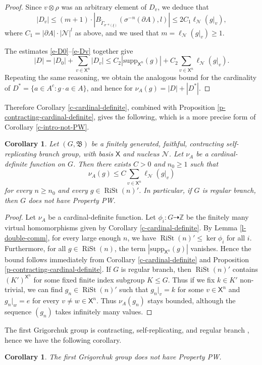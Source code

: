 \documentclass[11pt]{amsart}
\newcommand{\Z}{\ensuremath{\mathbb{Z}}}%
\newcommand{\bim}{\mathfrak{B}}
\newcommand{\rist}{\ensuremath{\operatorname{RiSt}}}%
\newcommand{\alb}{\ensuremath{\mathsf{X}}}%
\newcommand{\nuke}{\ensuremath{\mathcal{N}}}%
\newcommand{\Gammatilde}{\ensuremath{\widetilde{\Gamma}}}%
\theoremstyle{definition}
\theoremstyle{plain}
\newtheorem{main thm}{Theorem}
\newtheorem{cor}[defin]{Corollary}{}
\theoremstyle{remark}
\theoremstyle{plain}
\begin{document}
\begin{proof}
Since $v\otimes \rho$ was an arbitrary element of $D_v$, we deduce that 
\begin{equation} |D_v|\leq (m+1)\cdot |B_{\Gammatilde_{\sigma^{-n}(\xi)}}(\sigma^{-n}(\partial A), l)|\leq 2C_1 \ell_\nuke(g|_v), \label{e-Dv}\end{equation}
where $C_1=|\partial A|\cdot |\nuke |^l$ as above, and we used that $m=\ell_\nuke(g|_v)\ge 1$. 

The estimates \eqref{e-D0}--\eqref{e-Dv} together give 
\[|D|=|D_0|+\sum_{v\in \alb^n} |D_v| \leq C_2|\mathrm{supp}_{\alb^n}(g)|+ C_2\sum_{v\in \alb^n} \ell_\nuke(g|_v).\]
Repeating the same reasoning, we obtain the analogous bound for the cardinality of $D^\ast=\{a\in A^c\colon g\cdot a\in A\}$, and hence for $\nu_A(g)=|D|+|D^\ast|$. \qedhere
\end{proof}
Therefore Corollary \ref{c-cardinal-definite}, combined with Proposition \ref{p-contracting-cardinal-definite}, gives the following, which is a more precise form of Corollary \ref{c-intro-not-PW}. 
\begin{cor} \label{c-cardinal-definite-contracting}
Let $(G, \bim)$ be a finitely generated, faithful, contracting self-replicating branch group, with basis $\alb$ and nucleus $\nuke$. 
Let $\nu_A$ be a cardinal-definite function on $G$. Then there exists $C>0$ and $n_0\ge 1$ such that
\[\nu_A(g)\leq C\sum_{v\in \alb^n}\ell_\nuke(g|_v) \]
for every $n\ge n_0$ and every $g\in \rist(n)'$. In particular, if $G$ is regular branch, then $G$ does not have Property PW.

\end{cor}

\begin{proof}
    Let $\nu_A$ be a cardinal-definite function. Let $\phi_i\colon G\dashrightarrow \Z$ be the finitely many virtual homomorphisms given by Corollary \ref{c-cardinal-definite}. By Lemma \ref{l-double-comm}, for every large enough $n$, we have $\rist(n)'\le \ker \phi_i$ for all $i$. Furthermore, for all $g\in \rist(n)$,  the term $|\mathrm{supp}_{\alb^n}(g)|$ vanishes. Hence the bound follows immediately from Corollary \ref{c-cardinal-definite} and Proposition \ref{p-contracting-cardinal-definite}.  If $G$ is regular branch, then $\rist(n)'$ contains $(K')^{\alb^n}$ for some fixed finite index subgroup $K\le G$. Thus if we fix $k\in K'$ non-trivial, we can find $g_n\in \rist(n)'$ such that $g_n|_v=k$ for some $v\in \alb^n$ and $g_n|_w=e$ for every $v\neq w\in \alb^n$. Thus $\nu_A(g_n)$ stays bounded, although the sequence $(g_n)$ takes infinitely many values. \qedhere
\end{proof}
The first Grigorchuk group is contracting, self-replicating, and regular branch \cite{Gri-branch}, hence we have the following corollary.  
\begin{cor} \label{c-Grigorchuk-PW}
    The first Grigorchuk group does not have Property PW. 
\end{cor}
\end{document}
